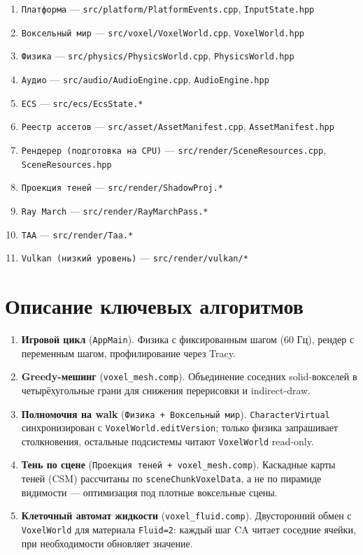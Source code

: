 \documentclass[
  11pt,a4paper,oneside]{article}
\providecommand{\tightlist}{%
  \setlength{\itemsep}{0pt}\setlength{\parskip}{0pt}}
\providecommand{\tightlist}{%
  \setlength{\itemsep}{0pt}\setlength{\parskip}{0pt}}
\begin{document}
\begin{enumerate}
\def\labelenumi{\arabic{enumi}.}
\tightlist
\item
  \texttt{Платформа} --- \texttt{src/platform/PlatformEvents.cpp}, \texttt{InputState.hpp}
\item
  \texttt{Воксельный\ мир} --- \texttt{src/voxel/VoxelWorld.cpp}, \texttt{VoxelWorld.hpp}
\item
  \texttt{Физика} --- \texttt{src/physics/PhysicsWorld.cpp}, \texttt{PhysicsWorld.hpp}
\item
  \texttt{Аудио} --- \texttt{src/audio/AudioEngine.cpp}, \texttt{AudioEngine.hpp}
\item
  \texttt{ECS} --- \texttt{src/ecs/EcsState.*}
\item
  \texttt{Реестр\ ассетов} --- \texttt{src/asset/AssetManifest.cpp}, \texttt{AssetManifest.hpp}
\item
  \texttt{Рендерер\ (подготовка\ на\ CPU)} --- \texttt{src/render/SceneResources.cpp}, \texttt{SceneResources.hpp}
\item
  \texttt{Проекция\ теней} --- \texttt{src/render/ShadowProj.*}
\item
  \texttt{Ray\ March} --- \texttt{src/render/RayMarchPass.*}
\item
  \texttt{TAA} --- \texttt{src/render/Taa.*}
\item
  \texttt{Vulkan\ (низкий\ уровень)} --- \texttt{src/render/vulkan/*}
\end{enumerate}

\section{Описание ключевых алгоритмов}\label{ux43eux43fux438ux441ux430ux43dux438ux435-ux43aux43bux44eux447ux435ux432ux44bux445-ux430ux43bux433ux43eux440ux438ux442ux43cux43eux432}

\begin{enumerate}
\def\labelenumi{\arabic{enumi}.}
\item
  \textbf{Игровой цикл} (\texttt{AppMain}). Физика с фиксированным шагом (60 Гц), рендер с переменным шагом, профилирование через Tracy.
\item
  \textbf{Greedy-мешинг} (\texttt{voxel\_mesh.comp}). Объединение соседних solid-вокселей в четырёхугольные грани для снижения перерисовки и indirect-draw.
\item
  \textbf{Полномочия на walk} (\texttt{Физика\ +\ Воксельный\ мир}). \texttt{CharacterVirtual} синхронизирован с \texttt{VoxelWorld.editVersion}; только физика запрашивает столкновения, остальные подсистемы читают \texttt{VoxelWorld} read-only.
\item
  \textbf{Тень по сцене} (\texttt{Проекция\ теней\ +\ voxel\_mesh.comp}). Каскадные карты теней (CSM) рассчитаны по \texttt{sceneChunkVoxelData}, а не по пирамиде видимости --- оптимизация под плотные воксельные сцены.
\item
  \textbf{Клеточный автомат жидкости} (\texttt{voxel\_fluid.comp}). Двусторонний обмен с \texttt{VoxelWorld} для материала \texttt{Fluid=2}: каждый шаг CA читает соседние ячейки, при необходимости обновляет значение.
\end{enumerate}
\end{document}
